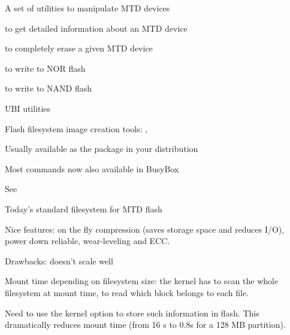   \startitemize
  \item A set of utilities to manipulate MTD devices
    \startitemize
    \item {} to get detailed information about an MTD device
    \item {} to completely erase a given MTD device
    \item {} to write to NOR flash
    \item {} to write to NAND flash
    \item UBI utilities
    \item Flash filesystem image creation tools: ,
    \stopitemize
  \item Usually available as the  package in your distribution
  \item Most commands now also available in BusyBox
  \item See 
  \stopitemize

    \startitemize
    \item Today's standard filesystem for MTD flash
    \item Nice features: on the fly compression (saves storage space
      and reduces I/O), power down reliable, wear-leveling and ECC.
    \item Drawbacks: doesn't scale well
      \startitemize
      \item Mount time depending on filesystem size: the kernel has to
        scan the whole filesystem at mount time, to read which block
        belongs to each file.
      \item Need to use the  kernel option
        to store such information in flash. This dramatically reduces
        mount time (from 16 s to 0.8s for a 128 MB partition).
      \stopitemize
    \item {}
    \stopitemize


